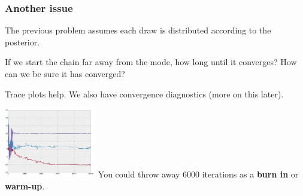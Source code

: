 \documentclass{beamer}
\begin{document}
\begin{frame}
\frametitle{Another issue}

The previous problem assumes each draw is distributed according to the posterior. 
\newline

If we start the chain far away from the mode, how long until it converges? How can we be sure it has converged?
\newline
\pause

Trace plots help. We also have convergence diagnostics (more on this later).
\newline

\includegraphics[width=40mm]{convergence.png} You could throw away $6000$ iterations as a {\bf burn in} or {\bf warm-up}.

\end{frame}
\end{document}
